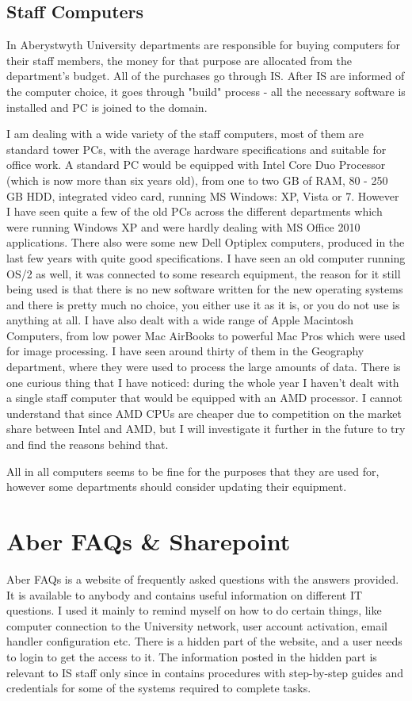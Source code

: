 \documentclass[10pt,a4paper,headinclude=true]{report}
\begin{document}
\subsection{Staff Computers}
In Aberystwyth University departments are responsible for buying computers for their staff members, the money for that purpose are allocated from the department's budget. All of the purchases go through IS. After IS are informed of the computer choice, it goes through "build" process - all the necessary software is installed and PC is joined to the domain. 

I am dealing with a wide variety of the staff computers, most of them are standard tower PCs, with the average hardware specifications and suitable for office work. A standard PC would be equipped with Intel Core Duo Processor (which is now more than six years old), from one to two GB of RAM, 80 - 250 GB HDD, integrated video card, running MS Windows: XP, Vista or 7. However I have seen quite a few of the old PCs across the different departments which were running Windows XP and were hardly dealing with MS Office 2010 applications. There also were some new Dell Optiplex computers, produced in the last few years with quite good specifications. I have seen an old computer running OS/2 as well, it was connected to some research equipment, the reason for it still being used is that there is no new software written for the new operating systems and there is pretty much no choice, you either use it as it is, or you do not use is anything at all. I have also dealt with a wide range of Apple Macintosh Computers, from low power Mac AirBooks to powerful Mac Pros which were used for image processing. I have seen around thirty of them in the Geography department, where they were used to process the large amounts of data. There is one curious thing that I have noticed: during the whole year I haven't dealt with a single staff computer that would be equipped with an AMD processor. I cannot understand that since AMD CPUs are cheaper due to competition on the market share between Intel and AMD, but I will investigate it further in the future to try and find the reasons behind that.

All in all computers seems to be fine for the purposes that they are used for, however some departments should consider updating their equipment. 

\section{Aber FAQs \& Sharepoint}
Aber FAQs is a website of frequently asked questions with the answers provided. It is available to anybody and contains useful information on different IT questions. I used it mainly to remind myself on how to do certain things, like computer connection to the University network, user account activation, email handler configuration etc. There is a hidden part of the website, and a user needs to login to get the access to it. The information posted in the hidden part is relevant to IS staff only since in contains procedures with step-by-step guides and credentials for some of the systems required to complete tasks.
\end{document}
